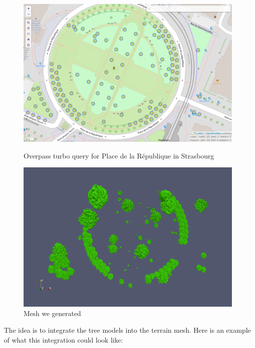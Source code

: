 \documentclass[12pt]{article}
\begin{document}
\begin{figure}[H]
    \begin{minipage}{0.45\textwidth}
        \centering
        \includegraphics[width=\textwidth]{images/republic_overpassturbo.png}
        \caption{Overpass turbo query for Place de la République in Strasbourg}
    \end{minipage}
    \begin{minipage}{0.45\textwidth}
        \centering
        \includegraphics[width=\textwidth]{images/republic_lod3.png}
        \caption{Mesh we generated}
    \end{minipage}
\end{figure}

The idea is to integrate the tree models into the terrain mesh.
Here is an example of what this integration could look like:
\end{document}
